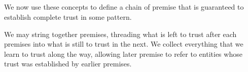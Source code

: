 {\begin{code}
\AgdaSymbol{)}\AgdaSpace{}%
\<%
\\
\>[0]\AgdaSpace{}%
%
\>[8]\AgdaSpace{}%
\AgdaSpace{}%
\AgdaSymbol{=}\AgdaSpace{}%
\AgdaSpace{}%
\<%
\\
\>[0]\AgdaSymbol{(}\AgdaSpace{}%
\AgdaSpace{}%
\AgdaSymbol{)}\AgdaSpace{}%
\AgdaSpace{}%
\AgdaSpace{}%
\AgdaSymbol{=}\AgdaSpace{}%
\AgdaSymbol{(}\AgdaSpace{}%
\AgdaSpace{}%
\AgdaSymbol{)}\AgdaSpace{}%
\AgdaSpace{}%
\AgdaSymbol{(}\AgdaSpace{}%
\AgdaSpace{}%
\AgdaSymbol{)}\<%
\\
\>[0]\AgdaSpace{}%
%
\>[8]\AgdaSpace{}%
\AgdaSpace{}%
\AgdaSymbol{=}\AgdaSpace{}%
\AgdaSpace{}%
\AgdaSymbol{(}\AgdaSpace{}%
\AgdaSpace{}%
\AgdaSymbol{)}\<%
\\
\>[0]%
\>[8]\AgdaSpace{}%
\AgdaSpace{}%
\AgdaSymbol{=}\AgdaSpace{}%
\<%
\end{code}
}
We now use these concepts to define a chain of premise that is guaranteed to
establish complete trust in some pattern.

We may string together premises, threading what is left to trust
after each premises into what is still to trust in the next. We collect everything
that we learn to trust along the way, allowing later premise to refer to entities
whose trust was established by earlier premises.

